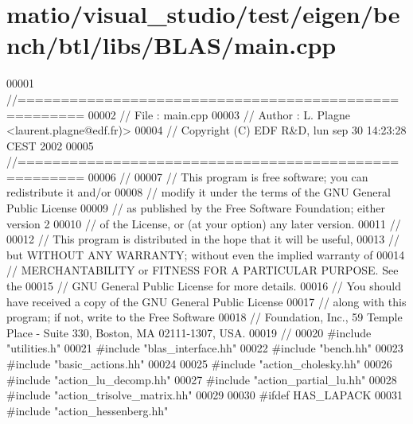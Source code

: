 \hypertarget{matio_2visual__studio_2test_2eigen_2bench_2btl_2libs_2_b_l_a_s_2main_8cpp_source}{}\section{matio/visual\+\_\+studio/test/eigen/bench/btl/libs/\+B\+L\+A\+S/main.cpp}
\label{matio_2visual__studio_2test_2eigen_2bench_2btl_2libs_2_b_l_a_s_2main_8cpp_source}

\begin{DoxyCode}
00001 \textcolor{comment}{//=====================================================}
00002 \textcolor{comment}{// File   :  main.cpp}
00003 \textcolor{comment}{// Author :  L. Plagne <laurent.plagne@edf.fr)>}
00004 \textcolor{comment}{// Copyright (C) EDF R&D,  lun sep 30 14:23:28 CEST 2002}
00005 \textcolor{comment}{//=====================================================}
00006 \textcolor{comment}{//}
00007 \textcolor{comment}{// This program is free software; you can redistribute it and/or}
00008 \textcolor{comment}{// modify it under the terms of the GNU General Public License}
00009 \textcolor{comment}{// as published by the Free Software Foundation; either version 2}
00010 \textcolor{comment}{// of the License, or (at your option) any later version.}
00011 \textcolor{comment}{//}
00012 \textcolor{comment}{// This program is distributed in the hope that it will be useful,}
00013 \textcolor{comment}{// but WITHOUT ANY WARRANTY; without even the implied warranty of}
00014 \textcolor{comment}{// MERCHANTABILITY or FITNESS FOR A PARTICULAR PURPOSE.  See the}
00015 \textcolor{comment}{// GNU General Public License for more details.}
00016 \textcolor{comment}{// You should have received a copy of the GNU General Public License}
00017 \textcolor{comment}{// along with this program; if not, write to the Free Software}
00018 \textcolor{comment}{// Foundation, Inc., 59 Temple Place - Suite 330, Boston, MA  02111-1307, USA.}
00019 \textcolor{comment}{//}
00020 \textcolor{preprocessor}{#include "utilities.h"}
00021 \textcolor{preprocessor}{#include "blas\_interface.hh"}
00022 \textcolor{preprocessor}{#include "bench.hh"}
00023 \textcolor{preprocessor}{#include "basic\_actions.hh"}
00024 
00025 \textcolor{preprocessor}{#include "action\_cholesky.hh"}
00026 \textcolor{preprocessor}{#include "action\_lu\_decomp.hh"}
00027 \textcolor{preprocessor}{#include "action\_partial\_lu.hh"}
00028 \textcolor{preprocessor}{#include "action\_trisolve\_matrix.hh"}
00029 
00030 \textcolor{preprocessor}{#ifdef HAS\_LAPACK}
00031 \textcolor{preprocessor}{#include "action\_hessenberg.hh"}

\end{DoxyCode}
